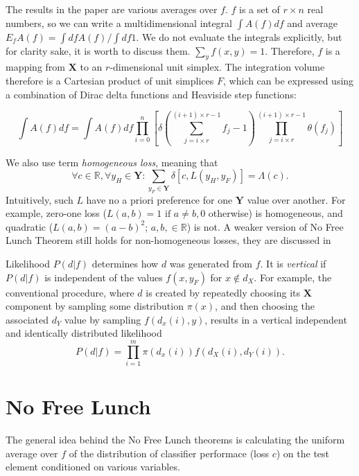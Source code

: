 \documentclass[a4paper]{article}
\begin{document}
The results in the paper are various averages over $f$. $f$ is a set
of $r\times n$ real numbers, so we can write a multidimensional
integral $\int A(f) df$ and average
$E_f A(f) = \int df A(f) / \int df 1$. We do not evaluate the
integrals explicitly, but for clarity sake, it is worth to discuss
them. $\sum_y f(x,y) = 1$. Therefore, $f$ is a mapping from
$\mathbf{X}$ to an $r$-dimensional unit simplex. The integration
volume therefore is a Cartesian product of unit simplices $F$, which
can be expressed using a combination of Dirac delta functions and
Heaviside step functions:

\begin{equation}
  \int A(f) df = \int A(f) df \prod_{i=0}^n\left[\delta\left(\sum_{j=i\times r}^{(i+1)\times r-1}f_j - 1\right) \prod_{j=i\times r}^{(i+1)\times r-1}\theta\left(f_j\right)  \right]
\end{equation}

We also use term \textit{homogeneous loss}, meaning that
\begin{equation}
  \forall c \in \mathbb{R}, \forall y_H \in \mathbf{Y}:
  \sum_{y_F \in \mathbf{Y}} \delta\left[c, L(y_H, y_F)\right] = \Lambda(c).
\end{equation}
Intuitively, such $L$ have no a priori preference for one $\mathbf{Y}$
value over another. For example, zero-one loss
($L(a,b) = 1 \text{ if } a\neq b, 0$ otherwise) is homogeneous, and
quadratic ($L(a,b) = (a - b)^2$; $a, b, \in \mathbb{R}$) is not. A
weaker version of No Free Lunch Theorem still holds for
non-homogeneous losses, they are discussed in \cite{Wolpert-yes-lunch}

Likelihood $P(d|f)$ determines how $d$ was generated from $f$. It is
\textit{vertical} if $P(d|f)$ is independent of the values $f(x, y_F)$
for $x \notin d_X$. For example, the conventional procedure, where $d$
is created by repeatedly choosing its $\mathbf{X}$ component by
sampling some distribution $\pi(x)$, and then choosing the associated
$d_Y$ value by sampling $f\left(d_x(i), y\right)$, results in a
vertical independent and identically distributed likelihood
\begin{equation}
  P(d|f) = \prod_{i=1}^m \pi(d_x(i)) f(d_X(i), d_Y(i)).
\end{equation}

\section{No Free Lunch}
The general idea behind the No Free Lunch theorems is calculating the
uniform average over $f$ of the distribution of classifier performace
(loss $c$) on the test element conditioned on various variables.
\end{document}
